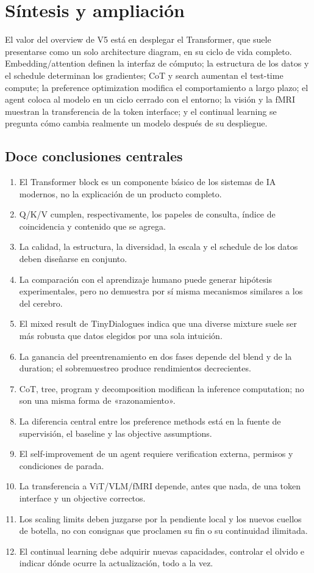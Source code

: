 \section{Síntesis y ampliación}

El valor del overview de V5 está en desplegar el Transformer, que suele presentarse como un solo architecture diagram, en su ciclo de vida completo. Embedding/attention definen la interfaz de cómputo; la estructura de los datos y el schedule determinan los gradientes; CoT y search aumentan el test-time compute; la preference optimization modifica el comportamiento a largo plazo; el agent coloca al modelo en un ciclo cerrado con el entorno; la visión y la fMRI muestran la transferencia de la token interface; y el continual learning se pregunta cómo cambia realmente un modelo después de su despliegue.

\subsection{Doce conclusiones centrales}

\begin{enumerate}
  \item El Transformer block es un componente básico de los sistemas de IA modernos, no la explicación de un producto completo.
  \item Q/K/V cumplen, respectivamente, los papeles de consulta, índice de coincidencia y contenido que se agrega.
  \item La calidad, la estructura, la diversidad, la escala y el schedule de los datos deben diseñarse en conjunto.
  \item La comparación con el aprendizaje humano puede generar hipótesis experimentales, pero no demuestra por sí misma mecanismos similares a los del cerebro.
  \item El mixed result de TinyDialogues indica que una diverse mixture suele ser más robusta que datos elegidos por una sola intuición.
  \item La ganancia del preentrenamiento en dos fases depende del blend y de la duration; el sobremuestreo produce rendimientos decrecientes.
  \item CoT, tree, program y decomposition modifican la inference computation; no son una misma forma de «razonamiento».
  \item La diferencia central entre los preference methods está en la fuente de supervisión, el baseline y las objective assumptions.
  \item El self-improvement de un agent requiere verification externa, permisos y condiciones de parada.
  \item La transferencia a ViT/VLM/fMRI depende, antes que nada, de una token interface y un objective correctos.
  \item Los scaling limits deben juzgarse por la pendiente local y los nuevos cuellos de botella, no con consignas que proclamen su fin o su continuidad ilimitada.
  \item El continual learning debe adquirir nuevas capacidades, controlar el olvido e indicar dónde ocurre la actualización, todo a la vez.
\end{enumerate}

